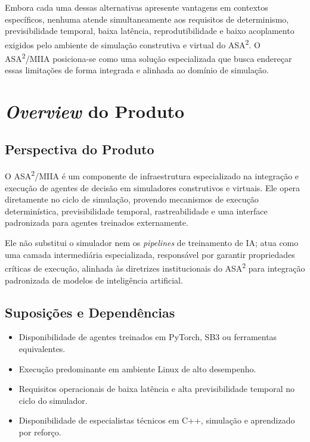 Embora cada uma dessas alternativas apresente vantagens em contextos específicos, nenhuma atende simultaneamente aos requisitos de determinismo, previsibilidade temporal, baixa latência, reprodutibilidade e baixo acoplamento exigidos pelo ambiente de simulação construtiva e virtual do ASA\textsuperscript{2}. O ASA\textsuperscript{2}/MIIA posiciona-se como uma solução especializada que busca endereçar essas limitações de forma integrada e alinhada ao domínio de simulação.

\section{\emph{Overview} do Produto}

\subsection{Perspectiva do Produto}

O ASA\textsuperscript{2}/MIIA é um componente de infraestrutura especializado na integração e execução de agentes de decisão em simuladores construtivos e virtuais. Ele opera diretamente no ciclo de simulação, provendo mecanismos de execução determinística, previsibilidade temporal, rastreabilidade e uma interface padronizada para agentes treinados externamente.

Ele não substitui o simulador nem os \emph{pipelines} de treinamento de IA; atua como uma camada intermediária especializada, responsável por garantir propriedades críticas de execução, alinhada às diretrizes institucionais do ASA\textsuperscript{2} para integração padronizada de modelos de inteligência artificial.

\subsection{Suposições e Dependências}

\begin{itemize}
    \item Disponibilidade de agentes treinados em PyTorch, SB3 ou ferramentas equivalentes.
    \item Execução predominante em ambiente Linux de alto desempenho.
    \item Requisitos operacionais de baixa latência e alta previsibilidade temporal no ciclo do simulador.
    \item Disponibilidade de especialistas técnicos em C++, simulação e aprendizado por reforço.
\end{itemize}

